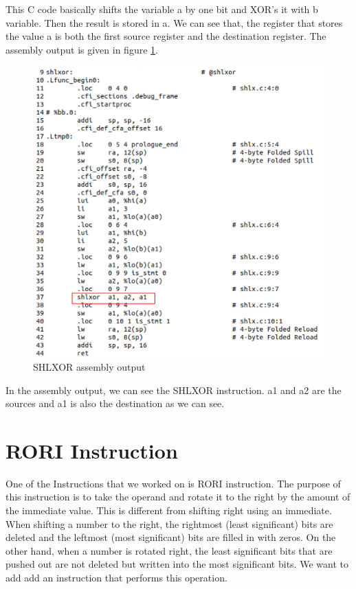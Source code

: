This C code basically shifts the variable a by one bit and XOR’s it with b variable. Then the result is stored in a. We can see that, the register that stores the value a is both the first source register and the destination register. The assembly output is given in figure \ref{fig:shlxor_assembly_output}.
\begin{figure}
    \centering
    \includegraphics{adding_new_instr/shlxor_assembly_output.png}
    \caption{SHLXOR assembly output}
    \label{fig:shlxor_assembly_output}
\end{figure}

In the assembly output, we can see the SHLXOR instruction. a1 and a2 are the sources and a1 is also the destination as we can see.

\section{RORI Instruction}
One of the Instructions that we worked on is RORI instruction. The purpose of this instruction is to take the operand and rotate it to the right by the amount of the immediate value. This is different from shifting right using an immediate. When shifting a number to the right, the rightmost (least significant) bits are deleted and the leftmost (most significant) bits are filled in with zeros. On the other hand, when a number is rotated right, the least significant bits that are pushed out are not deleted but written into the most significant bits. We want to add add an instruction that performs this operation.

